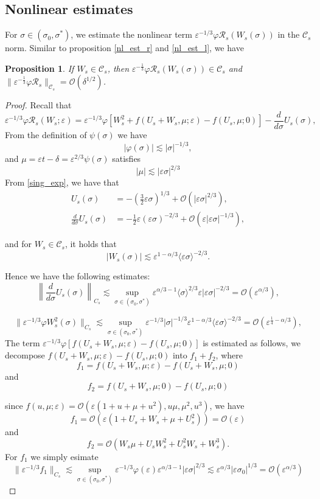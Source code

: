 \documentclass[letterpaper,11pt]{article}
\newcommand{\Ral}{\mathcal{R}}
\newcommand{\rmO}{\mathcal{O}}
\newcommand{\eps}{\varepsilon}
\newcommand{\lar}{ \lesssim }
\numberwithin{equation}{section}
\theoremstyle{plain}
\newtheorem{proposition}[theorem]{Proposition}
\begin{document}
\subsection{Nonlinear estimates}
For $\sigma \in (\sigma_0, \sigma^*)$, we estimate the nonlinear term $\eps^{-1/3}\varphi \Ral_s(W_s(\sigma))$ in the $\mathcal{C}_s$ norm. Similar to proposition \ref{nl_est_r} and \ref{nl_est_l}, we have
\begin{proposition}\label{nl_est_s} If $W_s \in \mathcal{C}_s$, then $\eps^{-\frac{1}{3}}\varphi \Ral_s(W_s(\sigma))  \in \mathcal{C}_{s}$ and $\| \eps^{-\frac{1}{3}}\varphi \Ral_s \|_{\mathcal{C}_s} = \rmO(\delta^{1/2})$.
\end{proposition}

\begin{proof}
Recall that
\[
\eps^{-1/3}\varphi\Ral_s(W_s;\eps) = \eps^{-1/3}\varphi\left[  W_s^2+ f(U_s+W_s, \mu ; \eps)-f(U_s,\mu;0) \right]- \frac{d}{d\sigma}U_s(\sigma),
\]
From the definition of $\psi(\sigma)$ we have
\[
|\varphi(\sigma)|  \lar | \sigma |^{-1/3},
\]
and $\mu = \eps t -\delta = \eps^{2/3} \psi(\sigma)$ satisfies
\[
|\mu | \lar |\eps\sigma|^{2/3}
\] 
From \eqref{sing_exp}, we have that
\begin{align*}
U_s(\sigma)  &= -\left(\frac{3}{2}\eps \sigma\right)^{1/3} + \rmO(|\eps \sigma|^{2/3} ),
\\
\frac{d}{d\sigma}U_s(\sigma) &= -\frac{1}{2}\eps(\eps\sigma)^{-2/3} + \rmO(\eps|\eps \sigma|^{-1/3}),
\end{align*}

and for $W_s \in \mathcal{C}_s$, it holds that
\[
|W_s(\sigma)| \lar \eps^{1-\alpha/3}\langle \eps \sigma\rangle^{-2/3}.
\]

Hence we have the following estimates:
\[
\left\|\frac{d}{d\sigma}U_s(\sigma) \right\|_{C_s}  \lar \sup_{\sigma \in (\sigma_0, \sigma^{*})}\eps^{\alpha/3-1}\langle \sigma\rangle^{2/3} \eps|\eps \sigma|^{-2/3} = \rmO(\eps^{\alpha/3}),
\]

\[
\|\eps^{-1/3}\varphi W_s^2(\sigma) \|_{C_s}  \lar \sup_{\sigma \in (\sigma_0, \sigma^{*})}\eps^{-1/3}|\sigma|^{-1/3}\eps^{1-\alpha/3}\langle \eps \sigma\rangle^{-2/3} = \rmO(\eps^{\frac{1}{4}-\alpha/3}),
\]
The term $\eps^{-1/3}\varphi[ f(U_s+W_s, \mu; \eps)-f(U_s,\mu; 0) ]$ is estimated as follows, we decompose $f(U_s+W_s,\mu;\eps)-f(U_s,\mu;0)$ into $f_1 + f_2$, where
\[
f_1 = f(U_s+W_s,\mu;\eps) - f(U_s+W_s,\mu;0)
\]
and 
\[
f_2 = f(U_s+W_s,\mu;0)  - f(U_s, \mu; 0)
\]

since $f(u,\mu ; \eps) = \rmO(\eps(1+u+\mu+u^2), u\mu,\mu^2,u^3)$, we have
\[
f_1 = \rmO(\eps(1+U_s+W_s+\mu+U_s^2)) = \rmO(\eps)
\]
and 
\[
f_2 = \rmO( W_s\mu + U_sW_s^2+U_s^2W_s+W_s^3).
\]
For $f_1$ we simply esimate
\[
\| \eps^{-1/3}f_1\|_{C_s} \lar \sup_{\sigma \in (\sigma_0, \sigma^{*})} \eps^{-1/3}\varphi (\eps) \eps^{\alpha/3-1}|\eps\sigma|^{2/3} \lar \eps^{\alpha/3}|\eps\sigma_0|^{1/3} = \rmO(\eps^{\alpha/3})
\]


\end{proof}
\end{document}
